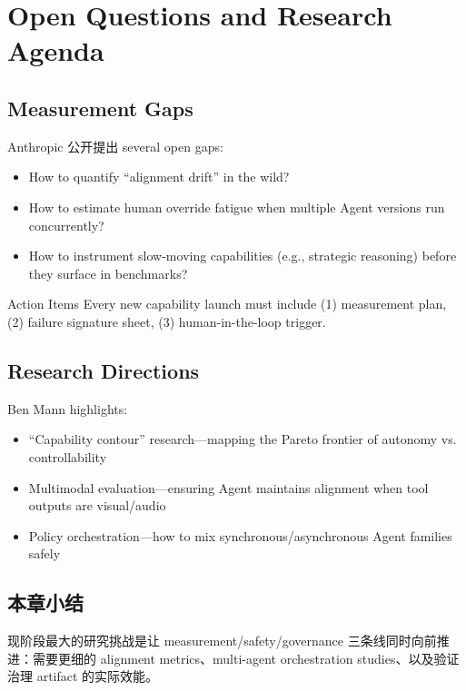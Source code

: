 \section{Open Questions and Research Agenda}

\subsection{Measurement Gaps}

Anthropic 公开提出 several open gaps:

\begin{itemize}
    \item How to quantify ``alignment drift'' in the wild?
    \item How to estimate human override fatigue when multiple Agent versions run concurrently?
    \item How to instrument slow-moving capabilities (e.g., strategic reasoning) before they surface in benchmarks?
\end{itemize}

\begin{knowledgebox}{Action Items}
Every new capability launch must include (1) measurement plan, (2) failure signature sheet, (3) human-in-the-loop trigger.
\end{knowledgebox}

\subsection{Research Directions}

Ben Mann highlights:

\begin{itemize}
    \item ``Capability contour'' research—mapping the Pareto frontier of autonomy vs. controllability
    \item Multimodal evaluation—ensuring Agent maintains alignment when tool outputs are visual/audio
    \item Policy orchestration—how to mix synchronous/asynchronous Agent families safely
\end{itemize}

\subsection{本章小结}

现阶段最大的研究挑战是让 measurement/safety/governance 三条线同时向前推进：需要更细的 alignment metrics、multi-agent orchestration studies、以及验证治理 artifact 的实际效能。

